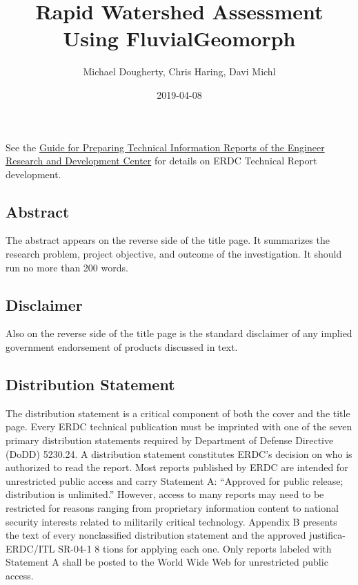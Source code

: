 \documentclass[]{book}
\title{Rapid Watershed Assessment Using FluvialGeomorph}
\author{Michael Dougherty, Chris Haring, Davi Michl}
\date{2019-04-08}
\theoremstyle{definition}
\theoremstyle{definition}
\theoremstyle{definition}
\theoremstyle{remark}
\begin{document}
\maketitle

{
\setcounter{tocdepth}{1}
\tableofcontents
}
\chapter*{}\label{section}

See the \href{http://www.dtic.mil/dtic/tr/fulltext/u2/a445281.pdf}{Guide
for Preparing Technical Information Reports of the Engineer Research and
Development Center} for details on ERDC Technical Report development.

\section{Abstract}\label{abstract}

The abstract appears on the reverse side of the title page. It
summarizes the research problem, project objective, and outcome of the
investigation. It should run no more than 200 words.

\section{Disclaimer}\label{disclaimer}

Also on the reverse side of the title page is the standard disclaimer of
any implied government endorsement of products discussed in text.

\section{Distribution Statement}\label{distribution-statement}

The distribution statement is a critical component of both the cover and
the title page. Every ERDC technical publication must be imprinted with
one of the seven primary distribution statements required by Department
of Defense Directive (DoDD) 5230.24. A distribution statement
constitutes ERDC's decision on who is authorized to read the report.
Most reports published by ERDC are intended for unrestricted public
access and carry Statement A: ``Approved for public release;
distribution is unlimited.'' However, access to many reports may need to
be restricted for reasons ranging from proprietary information content
to national security interests related to militarily critical
technology. Appendix B presents the text of every nonclassified
distribution statement and the approved justifica- ERDC/ITL SR-04-1 8
tions for applying each one. Only reports labeled with Statement A shall
be posted to the World Wide Web for unrestricted public access.
\end{document}
